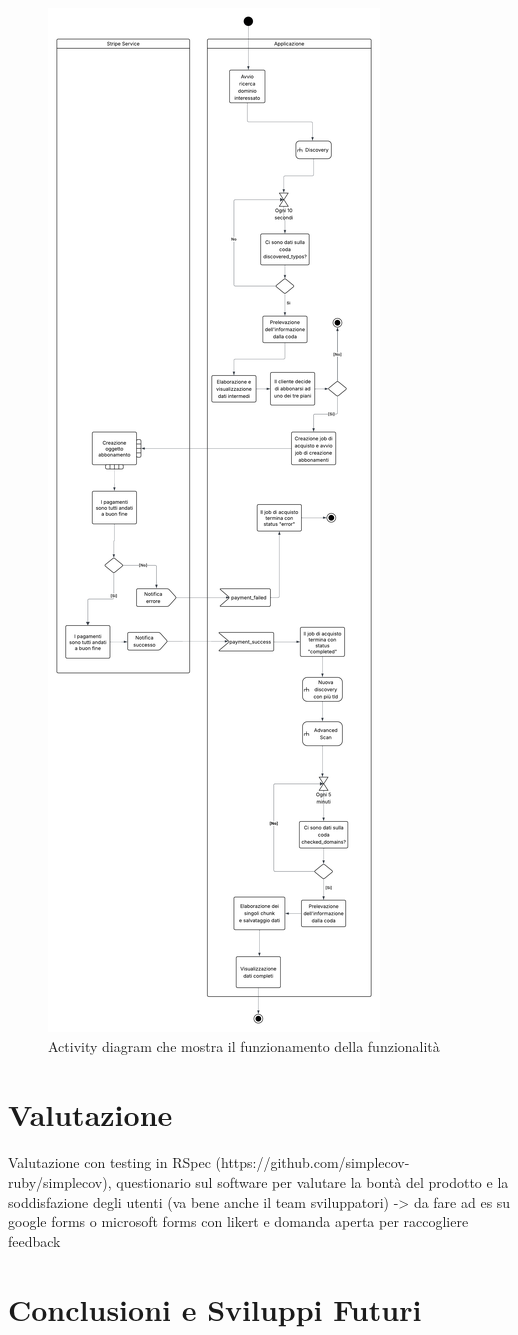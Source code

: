 \documentclass[target=bach,aauheader=,style=]{thud}
\begin{document}
\begin{figure}[h]
\centering
\includegraphics[width=0.4\linewidth]{Flowchart.png}
\caption{Activity diagram che mostra il funzionamento della funzionalità}
\label{fig:flowchart}
\end{figure}

\chapter{Valutazione}

Valutazione con testing in RSpec (https://github.com/simplecov-ruby/simplecov), questionario sul software per valutare
la bontà del prodotto e la soddisfazione degli utenti (va bene anche il team sviluppatori) -> da fare ad es su google forms o
microsoft forms con likert e domanda aperta per raccogliere feedback

\chapter{Conclusioni e Sviluppi Futuri}
\end{document}
